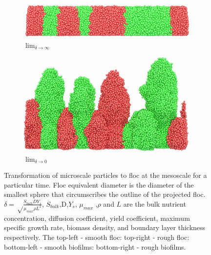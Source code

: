 \begin{figure}[!ht]
\begin{subfigure}[b]{.5\textwidth}
\includegraphics[width=.8\textwidth]{result2/bio11}
\caption{$\lim_{\delta \to \infty}$}
\end{subfigure}\hspace*{-1.5em}
\centering
\begin{subfigure}[b]{.50\textwidth}
\includegraphics[width=.8\textwidth]{result2/bio22}%
\caption{$\lim_{\delta \to 0}$}
\end{subfigure}\vspace*{-.5em}
\caption{Transformation of microscale particles to floc at the mesoscale for a particular time. Floc equivalent diameter is the diameter of the smallest sphere that circumscribes the outline of the projected floc. $\delta=\sqrt \frac{S_{bulk} D Y_s}{\mu_{max}\rho L^2}$, $S_{bulk}$,D,$Y_s$, $\mu_{max}$ ,$\rho$ and $L$ are the bulk nutrient concentration, diffusion coefficient, yield
coefficient, maximum specific growth rate, biomass density, and boundary layer thickness respectively. The top-left - smooth floc: top-right - rough floc: bottom-left - smooth biofilms: bottom-right - rough biofilms.}\label{diag2}
\end{figure}

